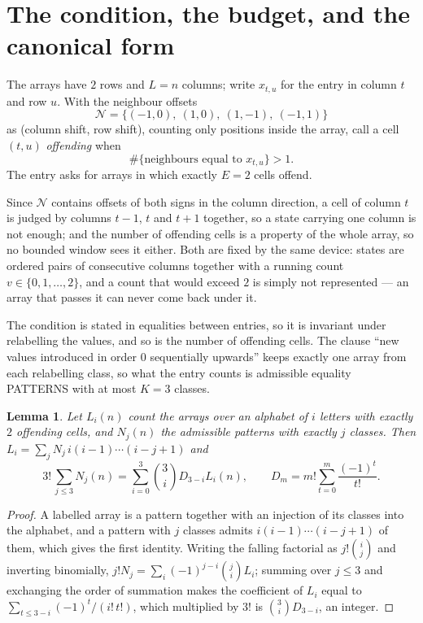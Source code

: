 \documentclass[11pt,a4paper]{article}
\theoremstyle{plain}
\newtheorem{lemma}[theorem]{Lemma}
\theoremstyle{definition}
\begin{document}
\section{The condition, the budget, and the canonical form}

The arrays have $2$ rows and $L=n$ columns; write $x_{t,u}$ for the entry in
column $t$ and row $u$. With the neighbour offsets
\[
\mathcal N=\{(-1,0),\ (1,0),\ (1,-1),\ (-1,1)\}
\]
as (column shift, row shift), counting only positions inside the array, call a cell
$(t,u)$ \emph{offending} when
\[
\#\{\text{neighbours equal to }x_{t,u}\}>1 .
\]
The entry asks for arrays in which exactly $E=2$ cells offend.

Since $\mathcal N$ contains offsets of both signs in the column direction, a cell of column
$t$ is judged by columns $t-1$, $t$ and $t+1$ together, so a state carrying one column is not
enough; and the number of offending cells is a property of the whole array, so no bounded
window sees it either. Both are fixed by the same device: states are ordered pairs of
consecutive columns together with a running count $v\in\{0,1,\dots,2\}$, and a count that
would exceed $2$ is simply not represented --- an array that passes it can never come back
under it.

The condition is stated in equalities between entries, so it is invariant under relabelling
the values, and so is the number of offending cells. The clause ``new values introduced in
order $0$ sequentially upwards'' keeps exactly one array from each relabelling class, so what
the entry counts is admissible equality PATTERNS with at most $K=3$ classes.

\begin{lemma}\label{lem:inv}
Let $L_i(n)$ count the arrays over an alphabet of $i$ letters with exactly $2$ offending
cells, and $N_j(n)$ the admissible patterns with exactly $j$ classes. Then
$L_i=\sum_j N_j\,i(i-1)\cdots(i-j+1)$ and
\[
3!\,\sum_{j\le3}N_j(n)=\sum_{i=0}^{3}\binom{3}{i}D_{3-i}L_i(n),
\qquad D_m=m!\sum_{t=0}^{m}\frac{(-1)^t}{t!} .
\]
\end{lemma}

\begin{proof}
A labelled array is a pattern together with an injection of its classes into the alphabet,
and a pattern with $j$ classes admits $i(i-1)\cdots(i-j+1)$ of them, which gives the first
identity. Writing the falling factorial as $j!\binom{i}{j}$ and inverting binomially,
$j!N_j=\sum_i(-1)^{j-i}\binom{j}{i}L_i$; summing over $j\le3$ and exchanging the
order of summation makes the coefficient of $L_i$ equal to
$\sum_{t\le3-i}(-1)^t/(i!\,t!)$, which multiplied by $3!$ is
$\binom{3}{i}D_{3-i}$, an integer.
\end{proof}
\end{document}
